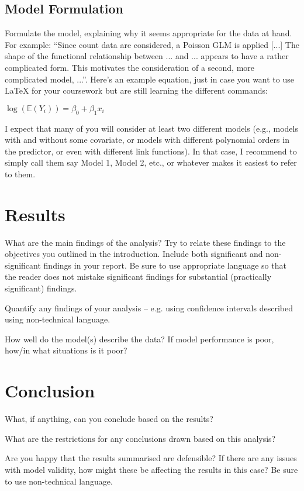 \documentclass[11pt, oneside]{article}
\begin{document}
\subsection{Model Formulation}

Formulate the model, explaining why it seems appropriate for the data at hand. For example: “Since count data are considered, a Poisson GLM is applied [...] The shape of the functional relationship between ... and ... appears to have a rather complicated form. This motivates the consideration of a second, more complicated model, ...”. Here’s an example equation, just in case you want to use LaTeX for your coursework but are still learning the different commands:

$\log(\mathbb{E}(Y_i)) = \beta_0 + \beta_1x_i$

I expect that many of you will consider at least two different models (e.g., models with and without
some covariate, or models with different polynomial orders in the predictor, or even with different link functions). In that case, I recommend to simply call them say Model 1, Model 2, etc., or whatever makes it easiest to refer to them.

\section{Results}

What are the main findings of the analysis? Try to relate these findings to the objectives you outlined in the introduction. Include both significant and non-significant findings in your report. Be sure to use appropriate language so that the reader does not mistake significant findings for substantial (practically significant) findings.

Quantify any findings of your analysis – e.g. using confidence intervals described using non-technical language.

How well do the model(s) describe the data? If model performance is poor, how/in what situations is it poor?

\section{Conclusion}

What, if anything, can you conclude based on the results? 

What are the restrictions for any conclusions drawn based on this analysis?

Are you happy that the results summarised are defensible? If there are any issues with model validity, how might these be affecting the results in this case? Be sure to use non-technical language.
\end{document}
